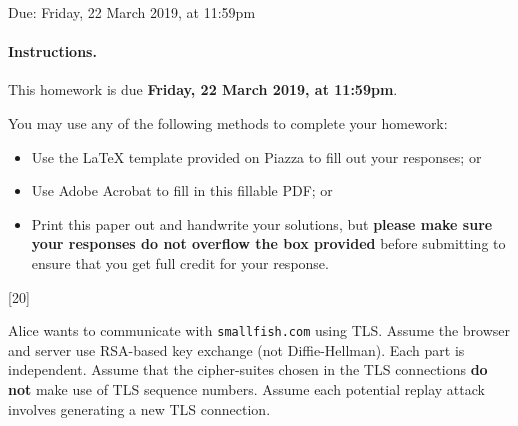 \documentclass[12pt]{exam}
\def\duedate{Friday, 22 March 2019}
\begin{document}
\begin{Form}

\begin{center}
  \large
  Due: \duedate, at 11:59pm
\end{center}

\paragraph{Instructions.}
This homework is due \textbf{\duedate, at 11:59pm}. 

\bigskip

You may use any of the following methods to complete your homework:
\begin{itemize}
    \item Use the LaTeX template provided on Piazza to fill out your responses; or
    \item Use Adobe Acrobat to fill in this fillable PDF; or
    \item Print this paper out and handwrite your solutions, but \textbf{please make sure your responses do not overflow the box provided} before submitting to ensure that you get full credit for your response.
\end{itemize}
  

\textbf{}

\begin{questions}

\newpage

[20]

Alice wants to communicate with \texttt{smallfish.com} using TLS. 
Assume the browser and server use RSA-based key exchange (not Diffie-Hellman).
Each part is independent. 
 Assume that the cipher-suites chosen in the TLS connections \textbf{do not} make use of TLS sequence numbers. Assume each potential replay attack involves generating a new TLS connection.

\end{questions}
\end{Form}
\end{document}
